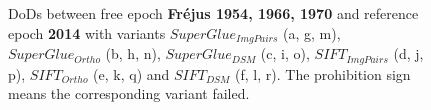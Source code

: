 \begin{figure}[htbp]
\begin{center}
		\caption{\ac{DoD}s between free epoch \textbf{Fr{\'e}jus 1954, 1966, 1970} and reference epoch \textbf{2014} with variants $SuperGlue_{ImgPairs}$ (a, g, m), $SuperGlue_{Ortho}$ (b, h, n), $SuperGlue_{DSM}$ (c, i, o), $SIFT_{ImgPairs}$ (d, j, p), $SIFT_{Ortho}$ (e, k, q) and $SIFT_{DSM}$ (f, l, r). The prohibition sign means the corresponding variant failed.}
		\label{DoDFrejus}
	\end{center}
\end{figure} 


